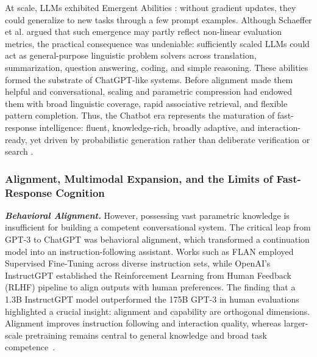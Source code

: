 At scale, LLMs exhibited Emergent Abilities \cite{wei2022emergent}: without gradient updates, they could generalize to new tasks through a few prompt examples. Although Schaeffer et al. \cite{schaeffer2023emergent} argued that such emergence may partly reflect non-linear evaluation metrics, the practical consequence was undeniable: sufficiently scaled LLMs could act as general-purpose linguistic problem solvers across translation, summarization, question answering, coding, and simple reasoning. These abilities formed the substrate of ChatGPT-like systems. Before alignment made them helpful and conversational, scaling and parametric compression had endowed them with broad linguistic coverage, rapid associative retrieval, and flexible pattern completion. Thus, the Chatbot era represents the maturation of fast-response intelligence: fluent, knowledge-rich, broadly adaptive, and interaction-ready, yet driven by probabilistic generation rather than deliberate verification or search \citep{li2025system1system2,wang2026agenttts,ji2026survey,huang2025m1,yang2026towards,wangthink}.



\subsubsection{Alignment, Multimodal Expansion, and the Limits of Fast-Response Cognition}

\textbf{\textit{Behavioral Alignment.}} However, possessing vast parametric knowledge is insufficient for building a competent conversational system. The critical leap from GPT-3 to ChatGPT was behavioral alignment, which transformed a continuation model into an instruction-following assistant. Works such as FLAN \cite{wei2021finetuned} employed Supervised Fine-Tuning across diverse instruction sets, while OpenAI's InstructGPT \cite{ouyang2022training} established the Reinforcement Learning from Human Feedback (RLHF) pipeline to align outputs with human preferences. The finding that a 1.3B InstructGPT model outperformed the 175B GPT-3 in human evaluations highlighted a crucial insight: alignment and capability are orthogonal dimensions. Alignment improves instruction following and interaction quality, whereas larger-scale pretraining remains central to general knowledge and broad task competence~\citep{kim2026cost,wu2024inference,xu2025let,lin2025plan,pan2025survey,jin2025energy}.

